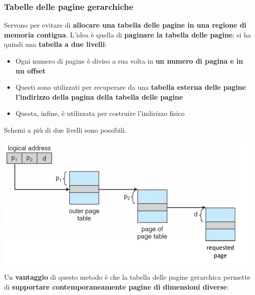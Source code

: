 \documentclass[12pt]{article}
\begin{document}
\subsubsection{Tabelle delle pagine gerarchiche}
Servono per evitare di \textbf{allocare una tabella delle pagine in una regione di memoria contigua}.
L'idea è quella di \textbf{paginare la tabella delle pagine}; si ha quindi una \textbf{tabella a due livelli}:
\begin{itemize}
    \item Ogni numero di pagine è diviso a sua volta in \textbf{un numero di pagina e in un offset}
    \item Questi sono utilizzati per recuperare da una \textbf{tabella esterna delle pagine l'indirizzo della pagina della tabella delle pagine}
    \item Questa, infine, è utilizzata per costruire l'indirizzo fisico
\end{itemize}
Schemi a più di due livelli sono possibili.
\begin{center}
    \includegraphics[width = 0.70\linewidth]{Images/62.png}
\end{center}
Un \textbf{vantaggio} di questo metodo è che la tabella delle pagine gerarchica permette di \textbf{supportare contemporaneamente pagine di dimensioni diverse}:
\end{document}
